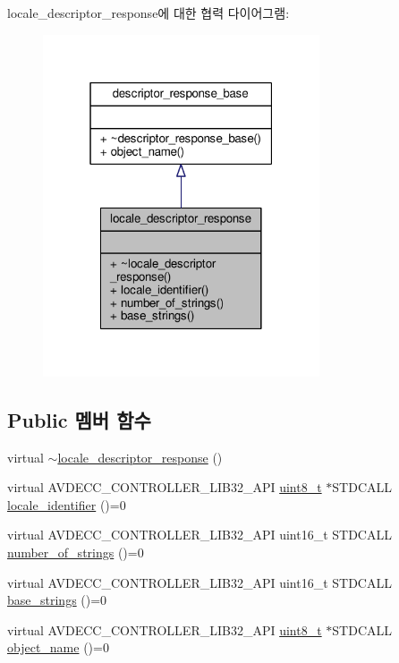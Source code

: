 locale\+\_\+descriptor\+\_\+response에 대한 협력 다이어그램\+:
\nopagebreak
\begin{figure}[H]
\begin{center}
\leavevmode
\includegraphics[width=232pt]{classavdecc__lib_1_1locale__descriptor__response__coll__graph}
\end{center}
\end{figure}
\subsection*{Public 멤버 함수}
\begin{DoxyCompactItemize}
\item 
virtual \hyperlink{classavdecc__lib_1_1locale__descriptor__response_a3addbe781e22e1683bd7b0fe322acb14}{$\sim$locale\+\_\+descriptor\+\_\+response} ()
\item 
virtual A\+V\+D\+E\+C\+C\+\_\+\+C\+O\+N\+T\+R\+O\+L\+L\+E\+R\+\_\+\+L\+I\+B32\+\_\+\+A\+PI \hyperlink{stdint_8h_aba7bc1797add20fe3efdf37ced1182c5}{uint8\+\_\+t} $\ast$S\+T\+D\+C\+A\+LL \hyperlink{classavdecc__lib_1_1locale__descriptor__response_a3d76182b9de2bf361ffaa6e7bd80d83c}{locale\+\_\+identifier} ()=0
\item 
virtual A\+V\+D\+E\+C\+C\+\_\+\+C\+O\+N\+T\+R\+O\+L\+L\+E\+R\+\_\+\+L\+I\+B32\+\_\+\+A\+PI uint16\+\_\+t S\+T\+D\+C\+A\+LL \hyperlink{classavdecc__lib_1_1locale__descriptor__response_af96235b5eab6537591e04e3ca5c20399}{number\+\_\+of\+\_\+strings} ()=0
\item 
virtual A\+V\+D\+E\+C\+C\+\_\+\+C\+O\+N\+T\+R\+O\+L\+L\+E\+R\+\_\+\+L\+I\+B32\+\_\+\+A\+PI uint16\+\_\+t S\+T\+D\+C\+A\+LL \hyperlink{classavdecc__lib_1_1locale__descriptor__response_ac7b74a81dead72df37408db4bd419b67}{base\+\_\+strings} ()=0
\item 
virtual A\+V\+D\+E\+C\+C\+\_\+\+C\+O\+N\+T\+R\+O\+L\+L\+E\+R\+\_\+\+L\+I\+B32\+\_\+\+A\+PI \hyperlink{stdint_8h_aba7bc1797add20fe3efdf37ced1182c5}{uint8\+\_\+t} $\ast$S\+T\+D\+C\+A\+LL \hyperlink{classavdecc__lib_1_1descriptor__response__base_a133f7774946d80f82b8aaaa4cfbb7361}{object\+\_\+name} ()=0
\end{DoxyCompactItemize}


